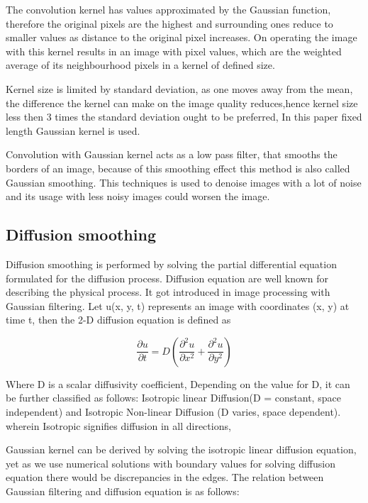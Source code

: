 \documentclass{ipol}
\begin{document}
The convolution kernel has values approximated by the Gaussian function, therefore the original pixels are the highest and surrounding ones reduce to smaller values as distance to the original pixel increases. On operating the image with this kernel results in an image with pixel values, which are the weighted average of its neighbourhood pixels in a kernel of defined size.

Kernel size is limited by standard deviation, as one moves away from the mean, the difference the kernel can make on the image quality reduces,hence kernel size less then 3 times the standard deviation ought to be preferred, In this paper fixed length Gaussian kernel is used.

Convolution with Gaussian kernel acts as a low pass filter\cite{Nikpour2010}, that smooths the borders of an image, because of this smoothing effect this method is also called Gaussian smoothing. This techniques is used to denoise images with a lot of noise and its usage with less noisy images could worsen the image\cite{Gedraite2011}.

\subsection{Diffusion smoothing}
Diffusion smoothing is performed by solving the partial differential equation formulated for the diffusion process. Diffusion equation are well known for describing the physical process\cite{Nikpour2010}. It got introduced in image processing with Gaussian filtering\cite{Ma2022}. Let u(x, y, t)
represents an image with coordinates (x, y) at time t, then
the 2-D diffusion equation is defined as

\begin{displaymath}
\frac{\partial u}{\partial t} = D\left(\frac{\partial^2 u}{\partial x^2} +\frac{\partial^2 u}{\partial y^2}\right)
\end{displaymath}

Where D is a scalar diffusivity coefficient, Depending on the value for D, it can be further classified as follows: Isotropic linear Diffusion(D = constant, space independent) and Isotropic Non-linear Diffusion (D varies, space dependent). wherein Isotropic signifies diffusion in all directions, 

Gaussian kernel can be derived by solving the isotropic linear diffusion equation, yet as we use numerical solutions with boundary values for solving diffusion equation there would be discrepancies in the edges\cite{Chung2001}. The relation between Gaussian filtering and diffusion equation is as follows:
\end{document}
